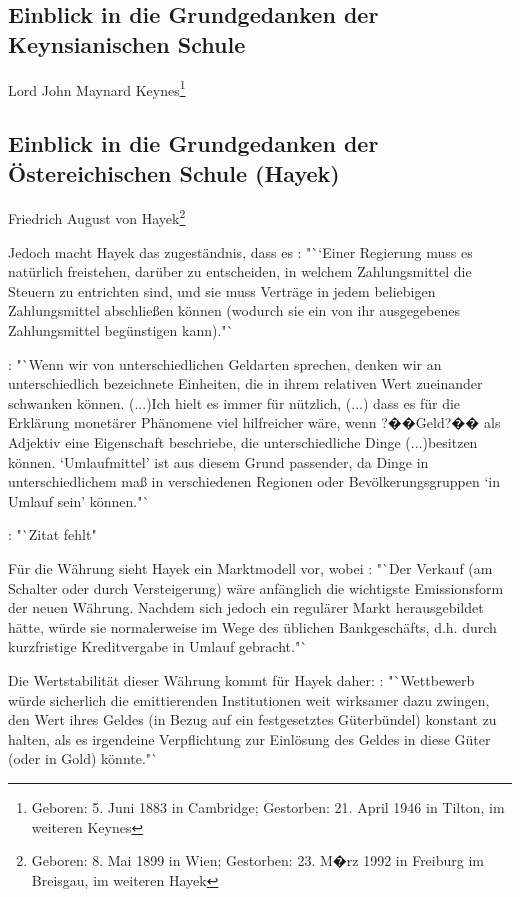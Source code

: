 \documentclass[
onecolumn,
a4paper,
abstracton,
parskip=half
,final
]{scrartcl}
\begin{document}
\subsection{Einblick in die Grundgedanken der Keynsianischen Schule}

Lord John Maynard Keynes\footnote[14]{Geboren:  5. Juni 1883 in Cambridge; Gestorben: 21. April 1946 in Tilton, im weiteren Keynes} 


\subsection{Einblick in die Grundgedanken der {\"O}stereichischen Schule (Hayek)}


Friedrich August von Hayek\footnote[15]{Geboren: 8. Mai 1899 in Wien; Gestorben: 23. M�rz 1992 in Freiburg im Breisgau, im weiteren Hayek}

Jedoch macht Hayek das zugest{\"a}ndnis, dass es \citep[vgl.][S.23]{Hayek1977}: "``Einer Regierung muss es nat{\"u}rlich freistehen, dar{\"u}ber zu entscheiden, in welchem Zahlungsmittel die Steuern zu entrichten sind, und sie muss Vertr{\"a}ge in jedem beliebigen Zahlungsmittel abschlie{\ss}en k{\"o}nnen (wodurch sie ein von ihr ausgegebenes Zahlungsmittel beg{\"u}nstigen kann)."`



\citep[vgl.][S.40f]{Hayek1977}: "`Wenn wir von unterschiedlichen Geldarten sprechen, denken wir an unterschiedlich bezeichnete Einheiten, die in ihrem relativen Wert zueinander schwanken k{\"o}nnen. (...)Ich hielt es immer f{\"u}r n{\"u}tzlich, (...) dass es f{\"u}r die Erkl{\"a}rung monet{\"a}rer Ph{\"a}nomene viel hilfreicher w{\"a}re, wenn ?��Geld?�� als Adjektiv eine Eigenschaft beschriebe, die unterschiedliche Dinge (...)besitzen k{\"o}nnen. `Umlaufmittel' ist aus diesem Grund passender, da Dinge in unterschiedlichem ma{\ss} in verschiedenen Regionen oder Bev{\"o}lkerungsgruppen `in Umlauf sein' k{\"o}nnen."`

\citep[vgl.][S.43]{Hayek1977}: "`Zitat fehlt"

F{\"u}r die W{\"a}hrung sieht Hayek ein Marktmodell vor, wobei \citep[vgl.][S.31]{Hayek1977}: "`Der Verkauf (am Schalter oder durch Versteigerung) w{\"a}re anf{\"a}nglich die wichtigste Emissionsform der neuen W{\"a}hrung. Nachdem sich jedoch ein regul{\"a}rer Markt herausgebildet h{\"a}tte, w{\"u}rde sie normalerweise im Wege des {\"u}blichen Bankgesch{\"a}fts, d.h. durch kurzfristige Kreditvergabe in Umlauf gebracht."`

Die Wertstabilit{\"a}t dieser W{\"a}hrung kommt f{\"u}r Hayek daher: \citep[vgl.][S.32]{Hayek1977}: "`Wettbewerb w{\"u}rde sicherlich die emittierenden Institutionen weit wirksamer dazu zwingen, den Wert ihres Geldes (in Bezug auf ein festgesetztes G{\"u}terb{\"u}ndel) konstant zu halten, als es irgendeine Verpflichtung zur Einl{\"o}sung des Geldes in diese G{\"u}ter (oder in Gold) k{\"o}nnte."`
\end{document}
